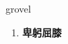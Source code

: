 
\begin{frame}
{\huge grovel}
\begin{center}
\begin{enumerate}\Large
  \item \textbf{卑躬屈膝}
\end{enumerate}
\end{center}
\end{frame}
